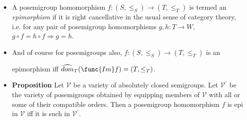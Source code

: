\documentclass[notes=show]{beamer}
\newenvironment{stepitemize}{\begin{itemize}[<+->]}{\end{itemize} }
\begin{document}
\begin{frame}%


\begin{stepitemize}
\item A posemigroup homomorphism $f:(S,\leq _{S})\longrightarrow (T,\leq
_{T})$ is termed an \textit{epimorphism} if it is right cancellative in the
usual sense of category theory, i.e. for any pair of posemigroup
homomorphisms $g,h:T\longrightarrow W$, $g\circ f=h\circ f\Longrightarrow
g=h $.\bigskip

\item And of course for posemigroups also, $f:(S,\leq _{S})\longrightarrow
(T,\leq _{T})$ is an\smallskip

epimorphism iff $\widehat{dom}_{T}(\func{Im}f)=(T,\leq _{T})$.
\end{stepitemize}

\transboxout%
\end{frame}%

\begin{frame}%


\begin{stepitemize}
\item \textbf{Proposition} Let $\mathcal{V}$ be a variety of absolutely
closed semigroups. Let $\mathcal{V}^{\prime }$ be the variety of
posemigroups obtained by equipping members of $\mathcal{V}$ with all or some
of their compatible orders. Then a posemigroup homomorphism $f$ is epi in $%
\mathcal{V}$ iff it is such in $\mathcal{V}^{\prime }$.
\end{stepitemize}

\transboxout%
\end{frame}%
\end{document}
